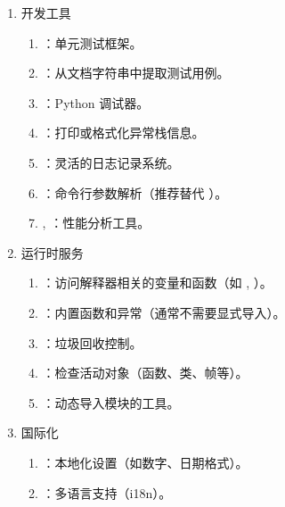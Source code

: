 \begin{enumerate}[label=\arabic*)]
    \item 开发工具
    \begin{enumerate}[itemindent=1em,label=(\arabic*)]
        \item {}：单元测试框架。
        \item {}：从文档字符串中提取测试用例。
        \item {}：Python 调试器。
        \item {}：打印或格式化异常栈信息。
        \item {}：灵活的日志记录系统。
        \item {}：命令行参数解析（推荐替代 ）。
        \item {}, ：性能分析工具。
    \end{enumerate}

    \item 运行时服务
    \begin{enumerate}[itemindent=1em,label=(\arabic*)]
        \item {}：访问解释器相关的变量和函数（如 , ）。
        \item {}：内置函数和异常（通常不需要显式导入）。
        \item {}：垃圾回收控制。
        \item {}：检查活动对象（函数、类、帧等）。
        \item {}：动态导入模块的工具。
    \end{enumerate}

    \item 国际化
    \begin{enumerate}[itemindent=1em,label=(\arabic*)]
        \item {}：本地化设置（如数字、日期格式）。
        \item {}：多语言支持（i18n）。
    \end{enumerate}


\end{enumerate}
